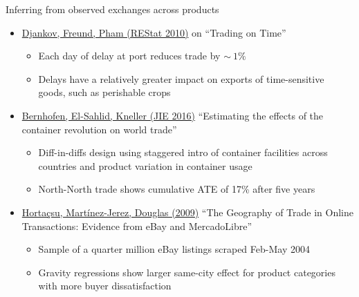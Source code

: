 \documentclass[10pt,notes=hide]{beamer}
\begin{document}
\begin{frame}{Inferring from observed exchanges across products}
\begin{itemize}
\item \href{https://www.mitpressjournals.org/doi/10.1162/rest.2009.11498}{Djankov, Freund, Pham (REStat 2010)} on ``Trading on Time''
\begin{itemize}
	\item Each day of delay at port reduces trade by $\sim~1\%$
	\item Delays have a relatively greater impact on exports of time-sensitive goods, such as perishable crops
\end{itemize}
\item \href{https://www.sciencedirect.com/science/article/pii/S0022199615001403}{Bernhofen, El-Sahlid, Kneller (JIE 2016)} ``Estimating the effects of the container revolution on world trade''
\begin{itemize}
	\item Diff-in-diffs design using staggered intro of container facilities across countries and product variation in container usage
	\item North-North trade shows cumulative ATE of 17\%  after five years
\end{itemize}
\item \href{http://www.jstor.org.proxy.uchicago.edu/stable/25760347}{Horta\c{c}su, Mart\'{i}nez-Jerez, Douglas (2009)} ``The Geography of Trade in Online Transactions: Evidence from eBay and MercadoLibre''
\begin{itemize}
	\item Sample of a quarter million eBay listings scraped Feb-May 2004
	\item Gravity regressions show larger same-city effect for product categories with more buyer dissatisfaction
\end{itemize}
\end{itemize}
\end{frame}
\end{document}
